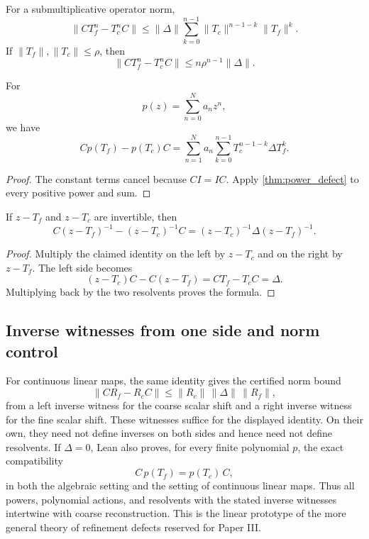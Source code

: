 \begin{corollary}\label{cor:defect-norm}
For a submultiplicative operator norm,
\[
\|CT_f^n-T_c^nC\|
\le
\|\Delta\|
\sum_{k=0}^{n-1}
\|T_c\|^{n-1-k}\|T_f\|^k.
\]
If $\|T_f\|,\|T_c\|\le\rho$, then
\[
\boxed{
\|CT_f^n-T_c^nC\|
\le n\rho^{n-1}\|\Delta\|.
}
\]
\end{corollary}

\begin{corollary}\label{cor:polynomial_defect}
For
\[
p(z)=\sum_{n=0}^Na_nz^n,
\]
we have
\[
Cp(T_f)-p(T_c)C
=
\sum_{n=1}^Na_n
\sum_{k=0}^{n-1}T_c^{n-1-k}\Delta T_f^k.
\]
\end{corollary}

\begin{proof}
The constant terms cancel because $CI=IC$.  Apply \cref{thm:power_defect} to every positive power and sum.
\end{proof}

\begin{theorem}\label{thm:resolvent_defect}\label{thm:resolvent-defect}
If $z-T_f$ and $z-T_c$ are invertible, then
\[
C(z-T_f)^{-1}-(z-T_c)^{-1}C
=
(z-T_c)^{-1}\Delta(z-T_f)^{-1}.
\]
\end{theorem}

\begin{proof}
Multiply the claimed identity on the left by $z-T_c$ and on the right by $z-T_f$.  The left side becomes
\[
(z-T_c)C-C(z-T_f)
=
CT_f-T_cC
=
\Delta.
\]
Multiplying back by the two resolvents proves the formula.
\end{proof}

\subsection{Inverse witnesses from one side and norm control}
For continuous linear maps, the same identity gives the certified norm bound
\[
\boxed{
\|C R_f-R_c C\|
\le \|R_c\|\,\|\Delta\|\,\|R_f\|,
}
\]
from a left inverse witness for the coarse scalar shift and a right inverse
witness for the fine scalar shift. These witnesses suffice for the displayed
identity. On their own, they need not define inverses on both sides and hence
need not define resolvents. If $\Delta=0$, Lean also proves, for every finite
polynomial $p$, the exact compatibility
\[
\boxed{C\,p(T_f)=p(T_c)\,C,}
\]
in both the algebraic setting and the setting of continuous linear maps. Thus
all powers, polynomial actions, and resolvents with the stated inverse
witnesses intertwine with coarse reconstruction. This is the linear prototype
of the more general theory of refinement defects reserved for Paper III.

